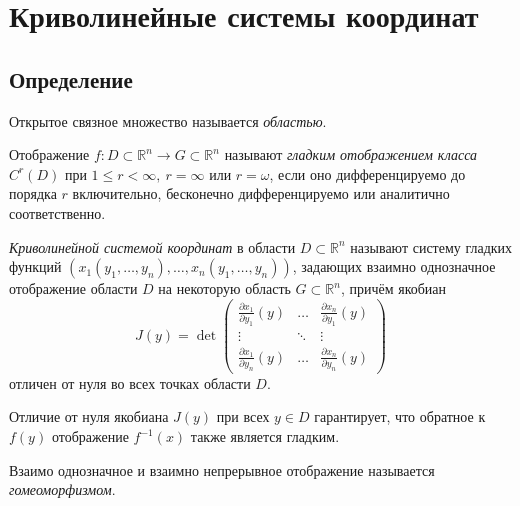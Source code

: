\section{Криволинейные системы координат}

\subsection{Определение}

\begin{definition}
  Открытое связное множество называется \textit{областью}.
\end{definition}

\begin{definition}
  Отображение $f : D \subset \mathbb{R}^n \to G \subset \mathbb{R}^n$ называют
  \textit{гладким отображением класса $C^r(D)$} при
  $1 \leqslant r < \infty,~r = \infty$ или $r = \omega$, если оно
  дифференцируемо до порядка $r$ включительно, бесконечно дифференцируемо или
  аналитично соответственно.
\end{definition}

\begin{definition}
  \textit{Криволинейной системой координат} в области $D \subset \mathbb{R}^n$
  называют систему гладких функций $(x_1 (y_1, \dots, y_n), \dots,
  x_n (y_1, \dots, y_n))$, задающих взаимно однозначное отображение области $D$
  на некоторую область $G \subset \mathbb{R}^n$, причём якобиан
  \begin{equation}
    J(y) = \det
    \left(
    \begin{array}{ccc}
      \frac{\partial x_1}{\partial y_1}(y) & \dots &
        \frac{\partial x_n}{\partial y_1}(y) \\
      \vdots & \ddots & \vdots \\
      \frac{\partial x_1}{\partial y_n}(y) & \dots &
        \frac{\partial x_n}{\partial y_n}(y)
    \end{array}
    \right)
  \end{equation}
  отличен от нуля во всех точках области $D$.
\end{definition}

\begin{remark}
  Отличие от нуля якобиана $J(y)$ при всех $y \in D$ гарантирует, что обратное
  к $f(y)$ отображение $f^{-1}(x)$ также является гладким.
\end{remark}

\begin{definition}
  Взаимо однозначное и взаимно непрерывное отображение называется
  \textit{гомеоморфизмом}.
\end{definition}

